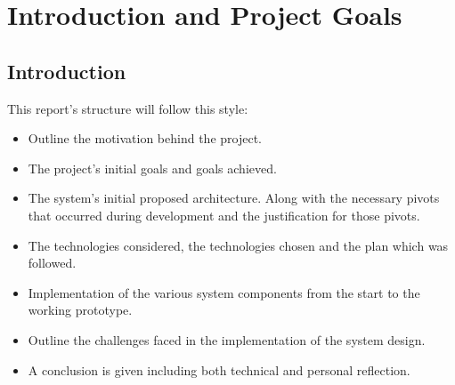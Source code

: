 \chapter{Introduction and Project Goals}
\label{chap:intro}

\section{Introduction}
This report's structure will follow this style:
\begin{itemize}
	\item Outline the motivation behind the project.
	\item The project's initial goals and goals achieved.
	\item The system's initial proposed architecture. Along with the necessary pivots
	      that occurred during development and the justification for those pivots.
	\item The technologies considered, the technologies chosen and the plan which was followed.
	\item Implementation of the various system components from the start to the working prototype.
	\item Outline the challenges faced in the implementation of the system design.
	\item A conclusion is given including both technical and personal reflection.
\end{itemize}
